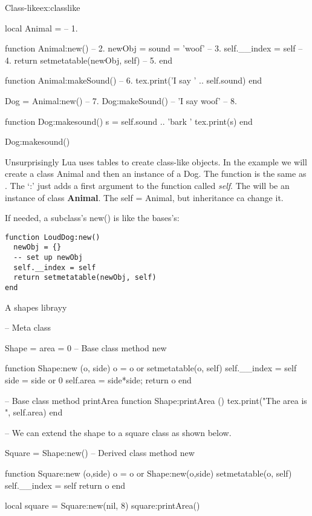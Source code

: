 \begin{texexample}{Class-like}{ex:classlike}
\begin{luacode}
local Animal = {}                        -- 1. 

function Animal:new()                    -- 2.
  newObj = {sound = 'woof'}              -- 3.
  self.__index = self                    -- 4.
  return setmetatable(newObj, self)      -- 5.
end

function Animal:makeSound()              -- 6.
  tex.print('I say ' .. self.sound)
end

Dog = Animal:new()                       -- 7.
Dog:makeSound()  -- 'I say woof'         -- 8.

function Dog:makesound()
  s = self.sound .. 'bark '
  tex.print(s)
end

Dog:makesound()
  
\end{luacode}
\end{texexample}

Unsurprisingly Lua uses tables to create class-like objects. In the example we will create a class Animal and then an instance of a Dog. The function  is the same as . The ‘:’ just adds a first argument to the function called \textit{self}.  The  will be an instance of class \textbf{Animal}. The self = Animal, but inheritance ca change it. 


If needed, a subclass's new() is like the bases's:

\begin{verbatim}
function LoudDog:new()
  newObj = {}
  -- set up newObj
  self.__index = self
  return setmetatable(newObj, self)
end
\end{verbatim}

\begin{texexample}{A shapes librayy}{}
\begin{luacode}
-- Meta class

Shape = {area = 0}
-- Base class method new

function Shape:new (o, side)
  o = o or {}
  setmetatable(o, self)
  self.__index = self
  side = side or 0
  self.area = side*side;
  return o
end

-- Base class method printArea
function Shape:printArea ()
  tex.print("The area is ", self.area)
end

-- We can extend the shape to a square class as shown below.

Square = Shape:new()
-- Derived class method new

function Square:new (o,side)
  o = o or Shape:new(o,side)
  setmetatable(o, self)
  self.__index = self
  return o
end

local square = Square:new(nil, 8)
square:printArea()
\end{luacode}
\end{texexample}

